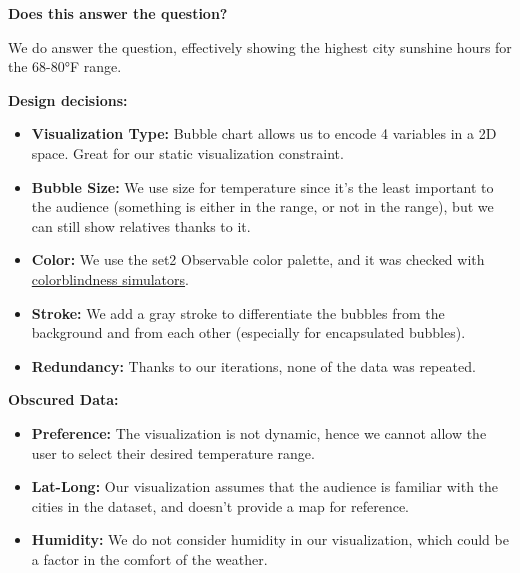 \documentclass{article}
\begin{document}
\textbf{Does this answer the question?}

We do answer the question, effectively showing the highest city sunshine hours for the 68-80°F range.

\textbf{Design decisions:}
\begin{itemize}
    \item \textbf{Visualization Type:} Bubble chart allows us to encode 4 variables in a 2D space. Great for our static visualization constraint. 
    \item \textbf{Bubble Size:} We use size for temperature since it's the least important to the audience (something is either in the range, or not in the range), but we can still show relatives thanks to it.
    \item \textbf{Color:} We use the set2 Observable color palette, and it was checked with \href{https://observablehq.com/@mjbo/color-schemes-under-color-vision-deficiency}{colorblindness simulators}.
    \item \textbf{Stroke:} We add a gray stroke to differentiate the bubbles from the background and from each other (especially for encapsulated bubbles).
    \item \textbf{Redundancy:} Thanks to our iterations, none of the data was repeated.
\end{itemize}

\pagebreak

\textbf{Obscured Data:}
\begin{itemize}
    \item \textbf{Preference:} The visualization is not dynamic, hence we cannot allow the user to select their desired temperature range.
    \item \textbf{Lat-Long:} Our visualization assumes that the audience is familiar with the cities in the dataset, and doesn't provide a map for reference.
    \item \textbf{Humidity:} We do not consider humidity in our visualization, which could be a factor in the comfort of the weather.
\end{itemize}



\end{document}
